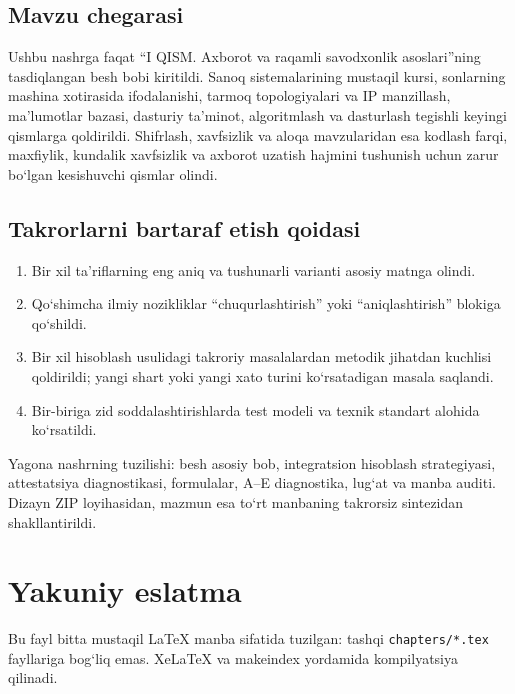 \documentclass[11pt,a4paper,oneside]{book}
\begin{document}
\section{Mavzu chegarasi}
\begin{scopebox}
Ushbu nashrga faqat “I QISM. Axborot va raqamli savodxonlik asoslari”ning tasdiqlangan besh bobi kiritildi. Sanoq sistemalarining mustaqil kursi, sonlarning mashina xotirasida ifodalanishi, tarmoq topologiyalari va IP manzillash, ma’lumotlar bazasi, dasturiy ta’minot, algoritmlash va dasturlash tegishli keyingi qismlarga qoldirildi. Shifrlash, xavfsizlik va aloqa mavzularidan esa kodlash farqi, maxfiylik, kundalik xavfsizlik va axborot uzatish hajmini tushunish uchun zarur bo‘lgan kesishuvchi qismlar olindi.
\end{scopebox}

\section{Takrorlarni bartaraf etish qoidasi}
\begin{enumerate}
\item Bir xil ta’riflarning eng aniq va tushunarli varianti asosiy matnga olindi.
\item Qo‘shimcha ilmiy nozikliklar “chuqurlashtirish” yoki “aniqlashtirish” blokiga qo‘shildi.
\item Bir xil hisoblash usulidagi takroriy masalalardan metodik jihatdan kuchlisi qoldirildi; yangi shart yoki yangi xato turini ko‘rsatadigan masala saqlandi.
\item Bir-biriga zid soddalashtirishlarda test modeli va texnik standart alohida ko‘rsatildi.
\end{enumerate}

\begin{summarybox}
Yagona nashrning tuzilishi: besh asosiy bob, integratsion hisoblash strategiyasi, attestatsiya diagnostikasi, formulalar, A--E diagnostika, lug‘at va manba auditi. Dizayn ZIP loyihasidan, mazmun esa to‘rt manbaning takrorsiz sintezidan shakllantirildi.
\end{summarybox}

\printindex
\backmatter
\chapter*{Yakuniy eslatma}
Bu fayl bitta mustaqil LaTeX manba sifatida tuzilgan: tashqi \texttt{chapters/*.tex} fayllariga bog‘liq emas. XeLaTeX va makeindex yordamida kompilyatsiya qilinadi.
\end{document}
